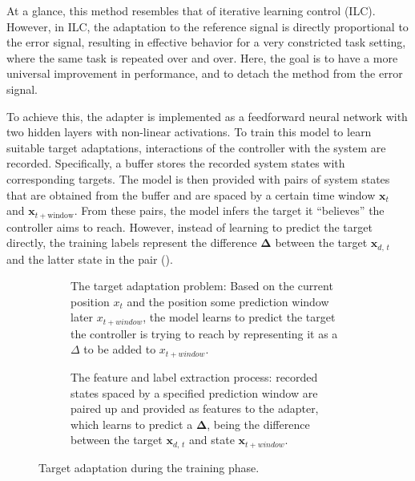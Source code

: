 At a glance, this method resembles that of iterative learning control (ILC).
However, in ILC, the adaptation to the reference signal is directly proportional to the error signal, resulting in effective behavior for a very constricted task setting, where the same task is repeated over and over.
Here, the goal is to have a more universal improvement in performance, and to detach the method from the error signal.

To achieve this, the adapter is implemented as a feedforward neural network with two hidden layers with non-linear activations.
To train this model to learn suitable target adaptations, interactions of the controller with the system are recorded.
Specifically, a buffer stores the recorded system states with corresponding targets.
The model is then provided with pairs of system states that are obtained from the buffer and are spaced by a certain time window $\mathbf{x}_t$ and $\mathbf{x}_{t+\text{window}}$.
From these pairs, the model infers the target it ``believes'' the controller aims to reach.
However, instead of learning to predict the target directly, the training labels represent the difference $\bm{\Delta}$ between the target $\mathbf{x}_{d, \,t}$ and the latter state in the pair ().

\begin{figure}
    \centering
    \begin{subfigure}[t]{\linewidth}
        \centering
        \def\svgwidth{0.67\linewidth}
        \footnotesize\selectfont
        \caption{The target adaptation problem: Based on the current position $x_t$ and the position some prediction window later $x_{t + \textit{window}}$, the model learns to predict the target the controller is trying to reach by representing it as a $\Delta$ to be added to $x_{t+\textit{window}}$.}
        \label{fig:target-adaptation-train}
        \vspace*{1em}
    \end{subfigure}
    \begin{subfigure}[b]{\linewidth}
        \centering
        \def\svgwidth{0.75\linewidth}
        \footnotesize\selectfont
        \caption{The feature and label extraction process: recorded states spaced by a specified prediction window are paired up and provided as features to the adapter, which learns to predict a $\bm{\Delta}$, being the difference between the target $\mathbf{x}_{d,\,t}$ and state $\mathbf{x}_{t + \textit{window}}$.}
        \label{fig:feature-extraction}
    \end{subfigure}
    \caption{Target adaptation during the training phase.}
\end{figure}

